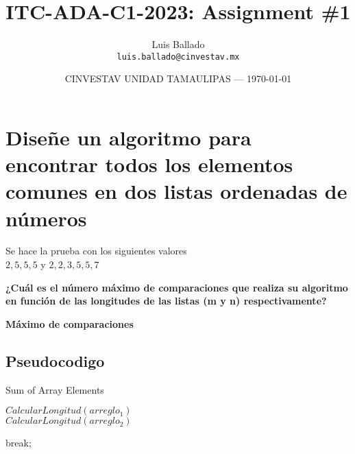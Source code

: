 \documentclass{article}
\title{ITC-ADA-C1-2023: Assignment \#1} %
\author{Luis Ballado\\ \texttt{luis.ballado@cinvestav.mx}} %
\date{CINVESTAV UNIDAD TAMAULIPAS --- \today} %
\begin{document}
\maketitle %


\section{Diseñe un algoritmo para encontrar todos los elementos comunes en dos listas ordenadas de números}

\begin{info} %
  Se hace la prueba con los siguientes valores\\
  $2,5,5,5$ y $2,2,3,5,5,7$
\end{info}

\begin{question}
  \textbf{¿Cuál es el número máximo de comparaciones que realiza su algoritmo en función de las longitudes de las listas (m y n) respectivamente?}

  \textbf{Máximo de comparaciones}
    
\end{question}


\subsection{Pseudocodigo}

\begin{center}
  \begin{minipage}{0.7\linewidth} %
    \begin{algorithm}[H] 
      \DontPrintSemicolon
      
      \caption{Sum of Array Elements}
      \label{alg:loop}
            {$CalcularLongitud(arreglo_{1})$}\\
            {$CalcularLongitud(arreglo_{2})$}

             {
               {
                break;\;
              }
            }
            
            
      
    \end{algorithm}
  \end{minipage}
\end{center}
\end{document}
